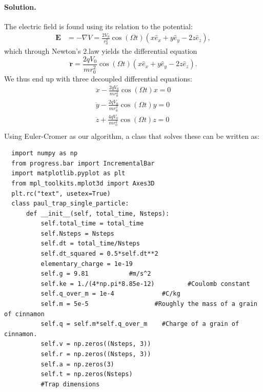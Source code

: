 \documentclass[%
oneside,                 %
final,                   %
10pt]{article}
\newenvironment{doconceexercise}{}{}
\begin{document}
\begin{doconceexercise}


\paragraph{Solution.}
The electric field is found using its relation to the potential:
\begin{equation}
  \begin{split}
    \boldsymbol{E} & = -\nabla V
    = \frac{2V_0}{r_0^2}\cos(\Omega t)(x\hat{e}_x + y\hat{e}_y - 2z\hat{e}_z ),
  \end{split}
\end{equation}
which through Newton's 2.law yields the differential equation
\begin{equation}
  \ddot{\boldsymbol{r}} = \frac{2qV_0}{mr_0^2}\cos(\Omega t) (x\hat{e}_x + y\hat{e}_y - 2z\hat{e}_z).
\end{equation}
We thus end up with three decoupled differential equations:
\begin{equation}
  \begin{split}
    \ddot{x} - \frac{2qV_0}{mr_0^2}\cos(\Omega t) x = 0 \\
    \ddot{y} - \frac{2qV_0}{mr_0^2}\cos(\Omega t) y = 0 \\
    \ddot{z} + \frac{4qV_0}{mr_0^2}\cos(\Omega t) z = 0 \\
  \end{split}
\end{equation}
Using Euler-Cromer as our algorithm, a class that solves these can be written as:
\begin{verbatim}
  import numpy as np
  from progress.bar import IncrementalBar
  import matplotlib.pyplot as plt
  from mpl_toolkits.mplot3d import Axes3D
  plt.rc("text", usetex=True)
  class paul_trap_single_particle:
      def __init__(self, total_time, Nsteps):
          self.total_time = total_time
          self.Nsteps = Nsteps
          self.dt = total_time/Nsteps
          self.dt_squared = 0.5*self.dt**2
          elementary_charge = 1e-19
          self.g = 9.81           #m/s^2
          self.ke = 1./(4*np.pi*8.85e-12)         #Coulomb constant
          self.q_over_m = 1e-4             #C/kg
          self.m = 5e-5                  #Roughly the mass of a grain of cinnamon
          self.q = self.m*self.q_over_m    #Charge of a grain of cinnamon.
          self.v = np.zeros((Nsteps, 3))
          self.r = np.zeros((Nsteps, 3))
          self.a = np.zeros(3)
          self.t = np.zeros(Nsteps)
          #Trap dimensions

\end{verbatim}
\end{doconceexercise}
\end{document}
